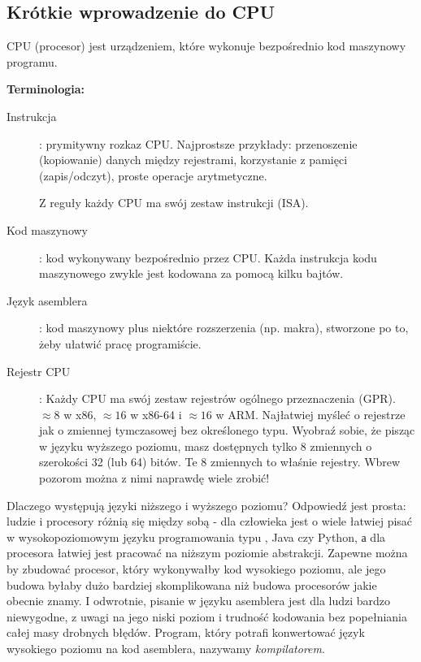 \subsection{Krótkie wprowadzenie do CPU}

\ac{CPU} (procesor) jest urządzeniem, które wykonuje bezpośrednio kod maszynowy programu.

\textbf{Terminologia:}

\begin{description}
\item[Instrukcja]: prymitywny rozkaz \ac{CPU}.
Najprostsze przykłady: przenoszenie (kopiowanie) danych między rejestrami, korzystanie z pamięci (zapis/odczyt), proste operacje arytmetyczne.

Z reguły każdy \ac{CPU} ma swój zestaw instrukcji (\ac{ISA}).

\item[Kod maszynowy]: kod wykonywany bezpośrednio przez \ac{CPU}. 
Każda instrukcja kodu maszynowego zwykle jest kodowana za pomocą kilku bajtów.
\item[Język asemblera]: kod maszynowy plus niektóre rozszerzenia (np. makra), stworzone po to, żeby ułatwić pracę programiście.
\item[Rejestr CPU]: Każdy \ac{CPU} ma swój zestaw rejestrów ogólnego przeznaczenia (\ac{GPR}).
$\approx 8$ w x86, $\approx 16$ w x86-64 i $\approx 16$ w ARM.
Najłatwiej myśleć o rejestrze jak o zmiennej tymczasowej bez określonego typu.
Wyobraź sobie, że pisząc w języku wyższego poziomu, masz dostępnych tylko 8 zmiennych o szerokości 32 (lub 64) bitów.
Te 8 zmiennych to właśnie rejestry. Wbrew pozorom można z nimi naprawdę wiele zrobić!
\end{description}

Dlaczego występują języki niższego i wyższego poziomu? Odpowiedź jest prosta: ludzie i procesory różnią się między sobą - dla człowieka jest o wiele łatwiej pisać w wysokopoziomowym języku programowania typu \CCpp, Java czy Python, а dla procesora łatwiej jest pracować na niższym poziomie abstrakcji.
Zapewne można by zbudować procesor, który wykonywałby kod wysokiego poziomu, ale jego budowa byłaby dużo bardziej skomplikowana niż  budowa procesorów jakie obecnie znamy.
I odwrotnie, pisanie w języku asemblera jest dla ludzi bardzo niewygodne, z uwagi na jego niski poziom i trudność kodowania bez popełniania całej masy drobnych błędów.
Program, który potrafi konwertować język wysokiego poziomu na kod asemblera, nazywamy \emph{kompilatorem}.

%
%
%

